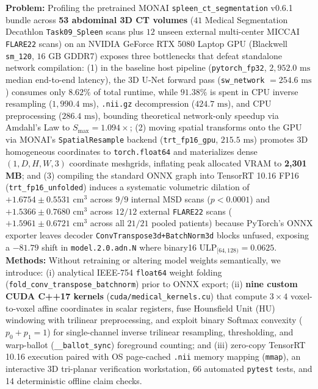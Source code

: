 \documentclass[10pt,twocolumn]{article}
\begin{document}
{\begin{@twocolumnfalse}
{\begin{minipage}{\dimexpr\textwidth-2\fboxsep-2\fboxrule\relax}
\textbf{Problem:} Profiling the pretrained MONAI \texttt{spleen\_ct\_segmentation} v0.6.1 bundle across \textbf{53 abdominal 3D CT volumes} ($41$ Medical Segmentation Decathlon \texttt{Task09\_Spleen} scans plus $12$ unseen external multi-center MICCAI \texttt{FLARE22} scans) on an NVIDIA GeForce RTX 5080 Laptop GPU (Blackwell \texttt{sm\_120}, $16\text{ GB}$ GDDR7) exposes three bottlenecks that defeat standalone network compilation: (1) in the baseline host pipeline (\texttt{pytorch\_fp32}, $2,952.0\text{ ms}$ median end-to-end latency), the 3D U-Net forward pass (\texttt{sw\_network} $= 254.6\text{ ms}$) consumes only $8.62\%$ of total runtime, while $91.38\%$ is spent in CPU inverse resampling ($1,990.4\text{ ms}$), \texttt{.nii.gz} decompression ($424.7\text{ ms}$), and CPU preprocessing ($286.4\text{ ms}$), bounding theoretical network-only speedup via Amdahl's Law to $S_{\max} = 1.094\times$; (2) moving spatial transforms onto the GPU via MONAI's \texttt{SpatialResample} backend (\texttt{trt\_fp16\_gpu}, $215.5\text{ ms}$) promotes 3D homogeneous coordinates to \texttt{torch.float64} and materializes dense $(1, D, H, W, 3)$ coordinate meshgrids, inflating peak allocated VRAM to \textbf{2,301 MB}; and (3) compiling the standard ONNX graph into TensorRT 10.16 FP16 (\texttt{trt\_fp16\_unfolded}) induces a systematic volumetric dilation of $+1.6754 \pm 0.5531\text{ cm}^3$ across $9/9$ internal MSD scans ($p < 0.0001$) and $+1.5366 \pm 0.7680\text{ cm}^3$ across $12/12$ external \texttt{FLARE22} scans ($+1.5961 \pm 0.6721\text{ cm}^3$ across all $21/21$ pooled patients) because PyTorch's ONNX exporter leaves decoder \texttt{ConvTranspose3d+BatchNorm3d} blocks unfused, exposing a $-81.79$ shift in \texttt{model.2.0.adn.N} where binary16 $\text{ULP}_{[64, 128)} = 0.0625$.
\textbf{Methods:} Without retraining or altering model weights semantically, we introduce: (i) analytical IEEE-754 \texttt{float64} weight folding (\texttt{fold\_conv\_transpose\_batchnorm}) prior to ONNX export; (ii) \textbf{nine custom CUDA C++17 kernels} (\texttt{cuda/medical\_kernels.cu}) that compute $3 \times 4$ voxel-to-voxel affine coordinates in scalar registers, fuse Hounsfield Unit (HU) windowing with trilinear preprocessing, and exploit binary Softmax convexity ($p_0 + p_1 = 1$) for single-channel inverse trilinear resampling, thresholding, and warp-ballot (\texttt{\_\_ballot\_sync}) foreground counting; and (iii) zero-copy TensorRT 10.16 execution paired with OS page-cached \texttt{.nii} memory mapping (\texttt{mmap}), an interactive 3D tri-planar verification workstation, 66 automated \texttt{pytest} tests, and 14 deterministic offline claim checks.

\end{minipage}}
\end{@twocolumnfalse}}
\end{document}
